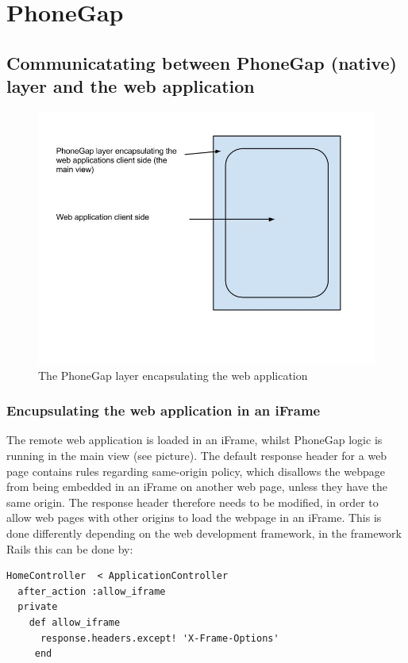 \section{PhoneGap}

\subsection{Communicatating between PhoneGap (native) layer and the web application}

\begin{figure}[ht!]
    \centering
    \includegraphics[width=120mm,natwidth=800,natheight=600]{./img/phonegap.jpg}
    \caption{The PhoneGap layer encapsulating the web application\label{overflow}}
\end{figure}


\subsubsection{Encupsulating the web application in an iFrame}
The remote web application is loaded in an iFrame, whilst PhoneGap logic is running in the main view (see picture). The default response header for a web page contains rules regarding same-origin policy, which disallows the webpage from being embedded in an iFrame on another web page, unless they have the same origin. The response header therefore needs to be modified, in order to allow web pages with other origins to load the webpage in an iFrame. 
This is done differently depending on the web development framework, in the framework Rails this can be done by: 

\begin{verbatim}
HomeController  < ApplicationController
  after_action :allow_iframe
  private
    def allow_iframe
      response.headers.except! 'X-Frame-Options'
     end
\end{verbatim}

